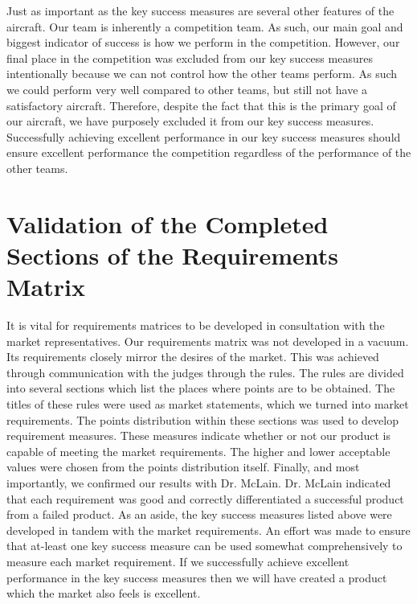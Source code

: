 \documentclass[]{auvsi_doc}
\begin{document}
Just as important as the key success measures are several other features of the aircraft. Our team is inherently a competition team. As such, our main goal and biggest indicator of success is how we perform in the competition. However, our final place in the competition was excluded from our key success measures intentionally because we can not control how the other teams perform. As such we could perform very well compared to other teams, but still not have a satisfactory aircraft. Therefore, despite the fact that this is the primary goal of our aircraft, we have purposely excluded it from our key success measures. Successfully achieving excellent performance in our key success measures should ensure excellent performance the competition regardless of the performance of the other teams.

\section{Validation of the Completed Sections of the Requirements Matrix}
It is vital for requirements matrices to be developed in consultation with the market representatives. Our requirements matrix was not developed in a vacuum. Its requirements closely mirror the desires of the market. This was achieved through communication with the judges through the rules. The rules are divided into several sections which list the places where points are to be obtained. The titles of these rules were used as market statements, which we turned into market requirements. The points distribution within these sections was used to develop requirement measures. These measures indicate whether or not our product is capable of meeting the market requirements. The higher and lower acceptable values were chosen from the points distribution itself. Finally, and most importantly, we confirmed our results with Dr. McLain. Dr. McLain indicated that each requirement was good and correctly differentiated a successful product from a failed product. As an aside, the key success measures listed above were developed in tandem with the market requirements. An effort was made to ensure that at-least one key success measure can be used somewhat comprehensively to measure each market requirement. If we successfully achieve excellent performance in the key success measures then we will have created a product which the market also feels is excellent.
\end{document}
